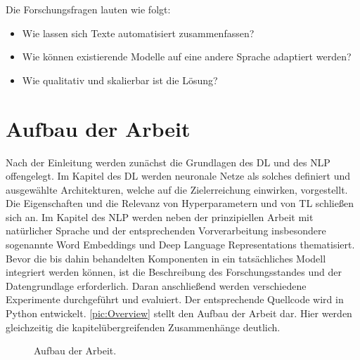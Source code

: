 Die Forschungsfragen lauten wie folgt:

\begin{itemize}
	\item Wie lassen sich Texte automatisiert zusammenfassen?
	\item Wie können existierende Modelle auf eine andere Sprache adaptiert werden?
	\item Wie qualitativ und skalierbar ist die Lösung?
\end{itemize}


\section{Aufbau der Arbeit}
\noindent
Nach der Einleitung werden zunächst die Grundlagen des \ac{DL} und des \ac{NLP} offengelegt. Im Kapitel des \ac{DL} werden neuronale Netze als solches definiert und ausgewählte Architekturen, welche auf die Zielerreichung einwirken, vorgestellt. Die Eigenschaften und die Relevanz von Hyperparametern und von \ac{TL} schließen sich an. Im Kapitel des \ac{NLP} werden neben der prinzipiellen Arbeit mit natürlicher Sprache und der entsprechenden Vorverarbeitung insbesondere sogenannte Word Embeddings und Deep Language Representations thematisiert. Bevor die bis dahin behandelten Komponenten in ein tatsächliches Modell integriert werden können, ist die Beschreibung des Forschungsstandes und der Datengrundlage erforderlich. Daran anschließend werden verschiedene Experimente durchgeführt und evaluiert. Der entsprechende Quellcode wird in Python entwickelt. \autoref{pic:Overview} stellt den Aufbau der Arbeit dar. Hier werden gleichzeitig die kapitelübergreifenden Zusammenhänge deutlich.
\newpage

\begin{figure}[h]
  \centering
  \caption{Aufbau der Arbeit.}
  \label{pic:Overview}
\end{figure}


